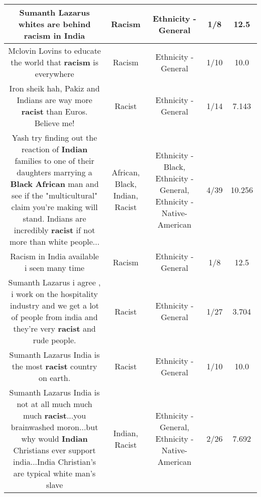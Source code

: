 \documentclass[11pt]{article}
\newlength\mylength
\begin{document}
\begin{center}
\begin{longtable}{|C{.65\mylength}|C{.30\mylength}|C{.12\mylength}|C{.12\mylength}|C{.12\mylength}|}
  \small Sumanth Lazarus whites are behind \textbf{racism} in India\normalsize   & Racism & Ethnicity - General & 1/8 & 12.5 \\  \hline
  \small Mclovin Lovins to educate the world that \textbf{racism} is everywhere\normalsize   & Racism & Ethnicity - General & 1/10 & 10.0 \\  \hline
  \small Iron sheik hah, Pakiz and Indians are way more \textbf{racist} than Euros. Believe me!\normalsize   & Racist & Ethnicity - General & 1/14 & 7.143 \\  \hline
  \small Yash try finding out the reaction of \textbf{Indian} families to one of their daughters marrying a \textbf{Black} \textbf{African} man and see if the "multicultural" claim you're making will stand. Indians are incredibly \textbf{racist} if not more than white people...\normalsize   & African, Black, Indian, Racist & Ethnicity - Black, Ethnicity - General, Ethnicity - Native-American & 4/39 & 10.256 \\  \hline
  \small Racism in India available i seen many time\normalsize   & Racism & Ethnicity - General & 1/8 & 12.5 \\  \hline
  \small Sumanth Lazarus i agree , i work on the hospitality industry and we get a lot of people from india and they're very \textbf{racist} and rude people.\normalsize   & Racist & Ethnicity - General & 1/27 & 3.704 \\  \hline
  \small Sumanth Lazarus India is the most \textbf{racist} country on earth.\normalsize   & Racist & Ethnicity - General & 1/10 & 10.0 \\  \hline
  \small Sumanth Lazarus India is not at all much much much \textbf{racist}...you brainwashed moron...but why would \textbf{Indian} Christians ever support india...India Christian's are typical white man's slave\normalsize   & Indian, Racist & Ethnicity - General, Ethnicity - Native-American & 2/26 & 7.692 \\  \hline

\end{longtable}
\end{center}
\end{document}
